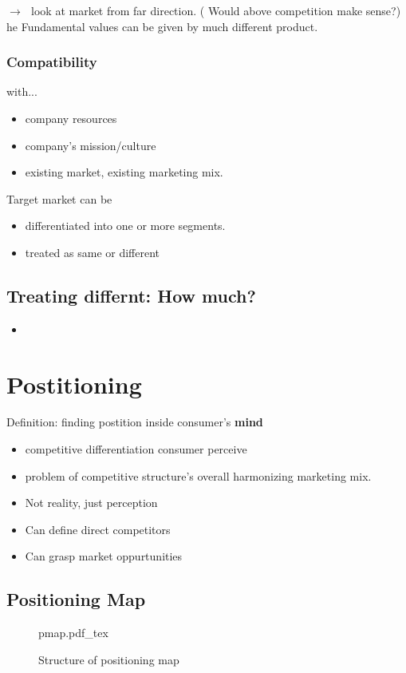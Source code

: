 \documentclass[12pt]{article}
\newcommand{\ra}{$\rightarrow \text{ }$}
\begin{document}
{\Huge {}}
\ra look at market from far direction. ( Would above competition make sense?)
he Fundamental values can be given by much different product.
\subsubsection{Compatibility}
with...
\begin{itemize}
	\item company resources
	\item company's mission/culture
	\item existing market, existing marketing mix.
\end{itemize}

Target market can be
\begin{itemize}
	\item differentiated into one or more segments.
	\item treated as same or different
\end{itemize}

\subsection{Treating differnt: How much?}
\begin{itemize}
	\item
\end{itemize}

\section{Postitioning}
Definition: finding postition inside consumer's \textbf{mind}
\hline
\begin{itemize}
	\item competitive differentiation consumer perceive
	\item problem of competitive structure's overall harmonizing marketing mix.
	\item Not reality, just perception
	\item Can define direct competitors
	\item Can grasp market oppurtunities
\end{itemize}
\subsection{Positioning Map}

\begin{figure}[H]
	\centering
	\def\svgwidth{\columnwidth}
	{pmap.pdf_tex}
	\caption{Structure of positioning map}
	\label{fig:pmap}
\end{figure}
\end{document}
